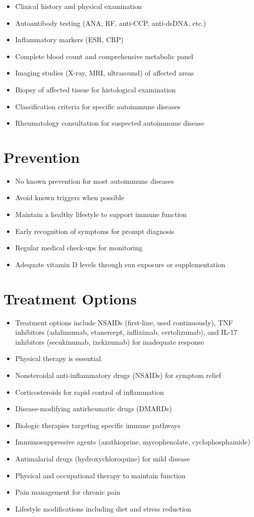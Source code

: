 \begin{itemize}[noitemsep]
  \item Clinical history and physical examination
  \item Autoantibody testing (ANA, RF, anti-CCP, anti-dsDNA, etc.)
  \item Inflammatory markers (ESR, CRP)
  \item Complete blood count and comprehensive metabolic panel
  \item Imaging studies (X-ray, MRI, ultrasound) of affected areas
  \item Biopsy of affected tissue for histological examination
  \item Classification criteria for specific autoimmune diseases
  \item Rheumatology consultation for suspected autoimmune disease
\end{itemize}
\section{Prevention}
\begin{itemize}[noitemsep]
  \item No known prevention for most autoimmune diseases
  \item Avoid known triggers when possible
  \item Maintain a healthy lifestyle to support immune function
  \item Early recognition of symptoms for prompt diagnosis
  \item Regular medical check-ups for monitoring
  \item Adequate vitamin D levels through sun exposure or supplementation
\end{itemize}
\section{Treatment Options}
\begin{itemize}[noitemsep]
  \item Treatment options include NSAIDs (first-line, used continuously), TNF inhibitors (adalimumab, etanercept, infliximab, certolizumab), and IL-17 inhibitors (secukinumab, ixekizumab) for inadequate response
  \item Physical therapy is essential.
  \item Nonsteroidal anti-inflammatory drugs (NSAIDs) for symptom relief
  \item Corticosteroids for rapid control of inflammation
  \item Disease-modifying antirheumatic drugs (DMARDs)
  \item Biologic therapies targeting specific immune pathways
  \item Immunosuppressive agents (azathioprine, mycophenolate, cyclophosphamide)
  \item Antimalarial drugs (hydroxychloroquine) for mild disease
  \item Physical and occupational therapy to maintain function
  \item Pain management for chronic pain
  \item Lifestyle modifications including diet and stress reduction
\end{itemize}
